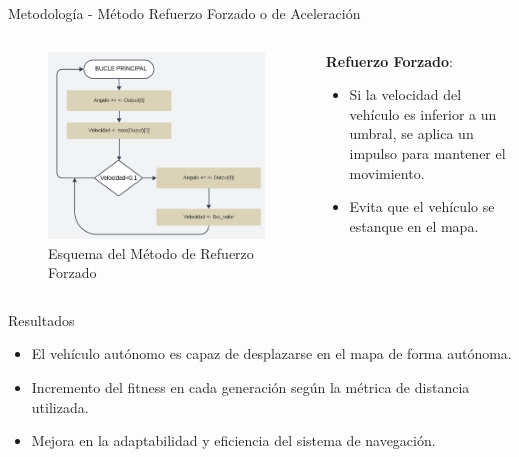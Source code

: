 \documentclass{beamer}
\begin{document}
\begin{frame}{Metodología - Método Refuerzo Forzado o de Aceleración}
    \begin{columns}[T] %
        \begin{column}{0.4\textwidth} %
            \begin{figure}
                \centering
                \includegraphics[width=1.1\linewidth]{images/reforce.png} %
                \caption{Esquema del Método de Refuerzo Forzado}
            \end{figure}
        \end{column}
        \begin{column}{0.6\textwidth}
            \textbf{Refuerzo Forzado}:
            \begin{itemize}
                \item Si la velocidad del vehículo es inferior a un umbral, se aplica un impulso para mantener el movimiento.
                \item Evita que el vehículo se estanque en el mapa.
            \end{itemize}
        \end{column}
    \end{columns}
\end{frame}

\begin{frame}{Resultados}
    \begin{itemize}
        \item El vehículo autónomo es capaz de desplazarse en el mapa de forma autónoma.
        \item Incremento del fitness en cada generación según la métrica de distancia utilizada.
        \item Mejora en la adaptabilidad y eficiencia del sistema de navegación.
    \end{itemize}
\end{frame}
\end{document}
